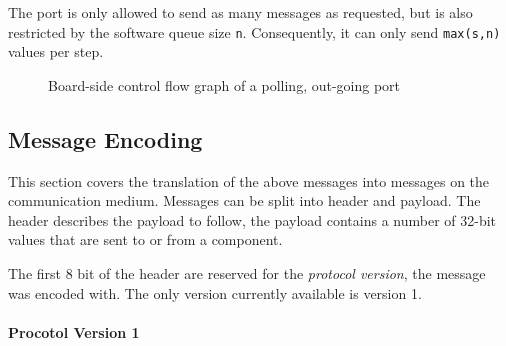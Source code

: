 \documentclass{report}
\begin{document}
The port is only allowed to send as many messages as requested, but is also restricted by the software queue size \texttt{n}. Consequently, it can only send \texttt{max(s,n)} values per step.

\begin{figure}[h]
\centering
{}
\label{fig:cfg:boardOut:poll}
\caption{Board-side control flow graph of a polling, out-going port}
\end{figure}

\subsection{Message Encoding}
\label{sec:protocol:encode}
This section covers the translation of the above messages into messages on the communication medium. Messages can be split into header and payload. The header describes the payload to follow, the payload contains a number of 32-bit values that are sent to or from a component.

The first 8 bit of the header are reserved for the \textit{protocol version}, the message was encoded with. The only version currently available is version 1.

\paragraph{Procotol Version 1}
\end{document}
